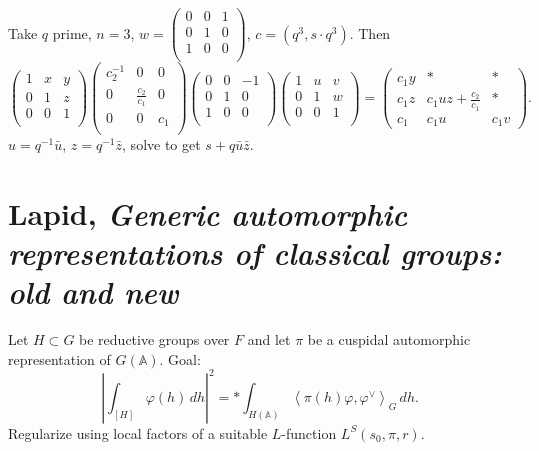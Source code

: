 \documentclass[reqno]{amsart} 
\begin{document}
\begin{example}
Take $q$ prime, $n = 3$, $w =
\begin{pmatrix}
0 & 0 & 1 \\
0 & 1 & 0 \\
1 & 0 & 0 \\
\end{pmatrix}$, $c = (q^3, s \cdot q^3 )$.  Then
\begin{equation*}
\begin{pmatrix}
1 & x & y \\
0 & 1 & z \\
0 & 0 & 1 \\
\end{pmatrix}
\begin{pmatrix}
c_2^{-1}  & 0 & 0 \\
0 & \frac{c_2}{c_1 } & 0 \\
0 & 0 & c_1  \\
\end{pmatrix}
\begin{pmatrix}
0 & 0 & -1 \\
0 & 1 & 0 \\
1 & 0 & 0 \\
\end{pmatrix}
\begin{pmatrix}
1 & u & v \\
0 & 1 & w \\
0 & 0 & 1 \\
\end{pmatrix}
=
\begin{pmatrix}c_{1} y & \ast & \ast  \\ c_{1} z & c_{1} u z + \frac{c_{2}}{c_{1}} & \ast \\c_{1} & c_{1} u & c_{1} v\end{pmatrix}.
\end{equation*}
$u = q^{-1} \bar{u}$, $z = q^{-1} \bar{z}$, solve to get $s + q \bar{u} \bar{z}$.
\end{example}

\section{Lapid, \emph{Generic automorphic representations of classical groups: old and new}}
Let $H \subset G$ be reductive groups over $F$ and let $\pi$ be a cuspidal automorphic representation of $G(\mathbb{A})$.  Goal:
\begin{equation*}
  \left\lvert \int_{[H]} \varphi (h) \, d h \right\rvert^2 = \ast \int_{H(\mathbb{A})}
  \left\langle \pi (h) \varphi, \varphi^\vee  \right\rangle_G \, d h.
\end{equation*}
Regularize using local factors of a suitable $L$-function $L^S (s_0, \pi, r)$.
\end{document}
